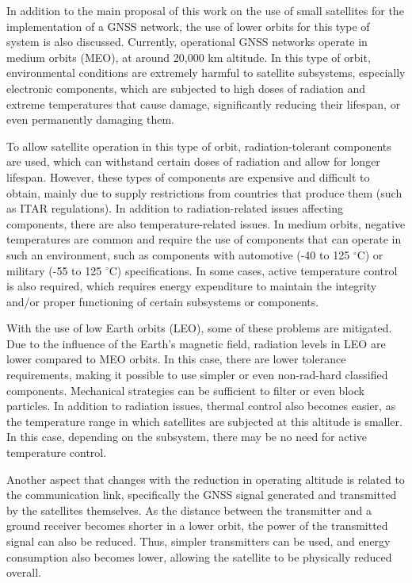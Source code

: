 In addition to the main proposal of this work on the use of small satellites for the implementation of a GNSS network, the use of lower orbits for this type of system is also discussed. Currently, operational GNSS networks operate in medium orbits (MEO), at around 20,000 km altitude. In this type of orbit, environmental conditions are extremely harmful to satellite subsystems, especially electronic components, which are subjected to high doses of radiation and extreme temperatures that cause damage, significantly reducing their lifespan, or even permanently damaging them.

To allow satellite operation in this type of orbit, radiation-tolerant components are used, which can withstand certain doses of radiation and allow for longer lifespan. However, these types of components are expensive and difficult to obtain, mainly due to supply restrictions from countries that produce them (such as ITAR regulations). In addition to radiation-related issues affecting components, there are also temperature-related issues. In medium orbits, negative temperatures are common and require the use of components that can operate in such an environment, such as components with automotive (-40 to 125 $^{\circ}$C) or military (-55 to 125 $^{\circ}$C) specifications. In some cases, active temperature control is also required, which requires energy expenditure to maintain the integrity and/or proper functioning of certain subsystems or components.

With the use of low Earth orbits (LEO), some of these problems are mitigated. Due to the influence of the Earth's magnetic field, radiation levels in LEO are lower compared to MEO orbits. In this case, there are lower tolerance requirements, making it possible to use simpler or even non-rad-hard classified components. Mechanical strategies can be sufficient to filter or even block particles. In addition to radiation issues, thermal control also becomes easier, as the temperature range in which satellites are subjected at this altitude is smaller. In this case, depending on the subsystem, there may be no need for active temperature control.

Another aspect that changes with the reduction in operating altitude is related to the communication link, specifically the GNSS signal generated and transmitted by the satellites themselves. As the distance between the transmitter and a ground receiver becomes shorter in a lower orbit, the power of the transmitted signal can also be reduced. Thus, simpler transmitters can be used, and energy consumption also becomes lower, allowing the satellite to be physically reduced overall.

